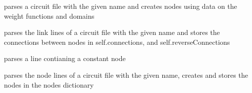 \documentclass[letterpaper,10pt,english]{sphinxmanual}
\begin{document}
\begin{fulllineitems}
\begin{fulllineitems}
\end{fulllineitems}


\begin{fulllineitems}
\label{\detokenize{index:parser.Parser.parseCircuit}}
parses a circuit file with the given name and creates nodes using data on the weight functions and domains

\end{fulllineitems}


\begin{fulllineitems}
\label{\detokenize{index:parser.Parser.parseConnections}}
parses the link lines of a circuit file with the given name and stores the connections between nodes in self.connections, 
and self.reverseConnections

\end{fulllineitems}


\begin{fulllineitems}
\label{\detokenize{index:parser.Parser.parseConst}}
parses a line contianing a constant node

\end{fulllineitems}


\begin{fulllineitems}
\label{\detokenize{index:parser.Parser.parseNodes}}
parses the node lines of a circuit file with the given name, creates and stores the nodes in the nodes dictionary


\end{fulllineitems}
\end{fulllineitems}
\end{document}
